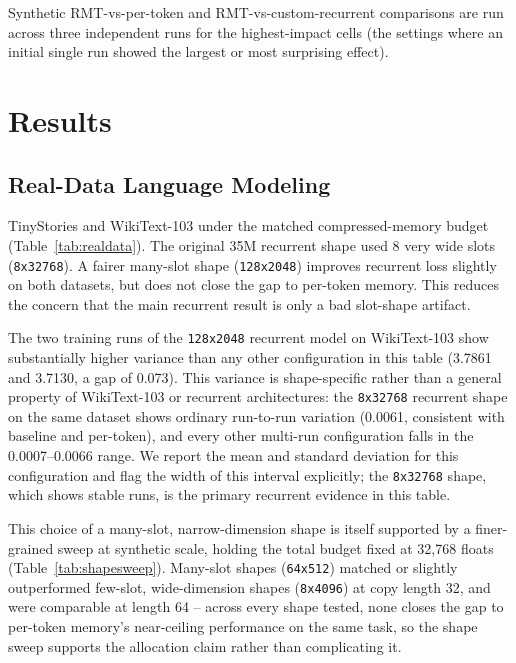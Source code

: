 \documentclass[10pt]{article} %
\begin{document}
Synthetic RMT-vs-per-token and RMT-vs-custom-recurrent comparisons are run
across three independent runs for the highest-impact cells (the settings
where an initial single run showed the largest or most surprising effect).

\section{Results}
\label{sec:results}

\subsection{Real-Data Language Modeling}
\label{sec:realdata-results}
TinyStories and WikiText-103 under the matched compressed-memory budget
(Table~\ref{tab:realdata}). The original 35M recurrent shape used 8 very
wide slots (\texttt{8x32768}). A fairer many-slot shape
(\texttt{128x2048}) improves recurrent loss slightly on both datasets, but
does not close the gap to per-token memory. This reduces the concern that
the main recurrent result is only a bad slot-shape artifact.

The two training runs of the \texttt{128x2048} recurrent model on
WikiText-103 show substantially higher variance than any other configuration
in this table (3.7861 and 3.7130, a gap of 0.073). This variance is
shape-specific rather than a general property of WikiText-103 or recurrent
architectures: the \texttt{8x32768} recurrent shape on the same dataset
shows ordinary run-to-run variation (0.0061, consistent with baseline and
per-token), and every other multi-run configuration falls in the 0.0007--0.0066
range. We report the mean and standard deviation for this configuration
and flag the width of this interval explicitly; the \texttt{8x32768} shape,
which shows stable runs, is the primary recurrent evidence in this table.

This choice of a many-slot, narrow-dimension shape is itself supported by a
finer-grained sweep at synthetic scale, holding the total budget fixed at
32,768 floats (Table~\ref{tab:shapesweep}). Many-slot shapes
(\texttt{64x512}) matched or slightly outperformed few-slot, wide-dimension
shapes (\texttt{8x4096}) at copy length 32, and were comparable at length
64 -- across every shape tested, none closes the gap to per-token memory's
near-ceiling performance on the same task, so the shape sweep supports the
allocation claim rather than complicating it.
\end{document}
